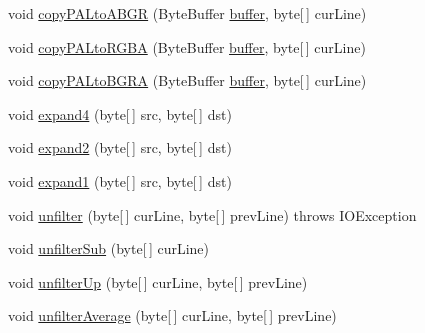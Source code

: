 \begin{DoxyCompactItemize}
\item 
void \mbox{\hyperlink{classorg_1_1newdawn_1_1slick_1_1opengl_1_1_p_n_g_decoder_af953ec84436cf0d1f6f01ccb06f0a7c6}{copy\+P\+A\+Lto\+A\+B\+GR}} (Byte\+Buffer \mbox{\hyperlink{classorg_1_1newdawn_1_1slick_1_1opengl_1_1_p_n_g_decoder_ae205f9222586a2bc01a8a240c5c210ad}{buffer}}, byte\mbox{[}$\,$\mbox{]} cur\+Line)
\item 
void \mbox{\hyperlink{classorg_1_1newdawn_1_1slick_1_1opengl_1_1_p_n_g_decoder_a5c051e4b5546f946205133a5001cb713}{copy\+P\+A\+Lto\+R\+G\+BA}} (Byte\+Buffer \mbox{\hyperlink{classorg_1_1newdawn_1_1slick_1_1opengl_1_1_p_n_g_decoder_ae205f9222586a2bc01a8a240c5c210ad}{buffer}}, byte\mbox{[}$\,$\mbox{]} cur\+Line)
\item 
void \mbox{\hyperlink{classorg_1_1newdawn_1_1slick_1_1opengl_1_1_p_n_g_decoder_a5df8dd1ce316baadb24936f6d039052f}{copy\+P\+A\+Lto\+B\+G\+RA}} (Byte\+Buffer \mbox{\hyperlink{classorg_1_1newdawn_1_1slick_1_1opengl_1_1_p_n_g_decoder_ae205f9222586a2bc01a8a240c5c210ad}{buffer}}, byte\mbox{[}$\,$\mbox{]} cur\+Line)
\item 
void \mbox{\hyperlink{classorg_1_1newdawn_1_1slick_1_1opengl_1_1_p_n_g_decoder_a0ca84983943d5e90a184e0ac16833d4e}{expand4}} (byte\mbox{[}$\,$\mbox{]} src, byte\mbox{[}$\,$\mbox{]} dst)
\item 
void \mbox{\hyperlink{classorg_1_1newdawn_1_1slick_1_1opengl_1_1_p_n_g_decoder_aa9bfde671b761d559aaa785457ec5c94}{expand2}} (byte\mbox{[}$\,$\mbox{]} src, byte\mbox{[}$\,$\mbox{]} dst)
\item 
void \mbox{\hyperlink{classorg_1_1newdawn_1_1slick_1_1opengl_1_1_p_n_g_decoder_ae4687a998385d98ed9e733def922f1ed}{expand1}} (byte\mbox{[}$\,$\mbox{]} src, byte\mbox{[}$\,$\mbox{]} dst)
\item 
void \mbox{\hyperlink{classorg_1_1newdawn_1_1slick_1_1opengl_1_1_p_n_g_decoder_acc27514c9030ef279d2322f986bde82a}{unfilter}} (byte\mbox{[}$\,$\mbox{]} cur\+Line, byte\mbox{[}$\,$\mbox{]} prev\+Line)  throws I\+O\+Exception 
\item 
void \mbox{\hyperlink{classorg_1_1newdawn_1_1slick_1_1opengl_1_1_p_n_g_decoder_a1939d148e672836c11da54bc8edf16fe}{unfilter\+Sub}} (byte\mbox{[}$\,$\mbox{]} cur\+Line)
\item 
void \mbox{\hyperlink{classorg_1_1newdawn_1_1slick_1_1opengl_1_1_p_n_g_decoder_a5d759acd42a8f0e0569c534c1a9bcf55}{unfilter\+Up}} (byte\mbox{[}$\,$\mbox{]} cur\+Line, byte\mbox{[}$\,$\mbox{]} prev\+Line)
\item 
void \mbox{\hyperlink{classorg_1_1newdawn_1_1slick_1_1opengl_1_1_p_n_g_decoder_ae3f43d398d4d8cc4900900e9a3d0adff}{unfilter\+Average}} (byte\mbox{[}$\,$\mbox{]} cur\+Line, byte\mbox{[}$\,$\mbox{]} prev\+Line)

\end{DoxyCompactItemize}
